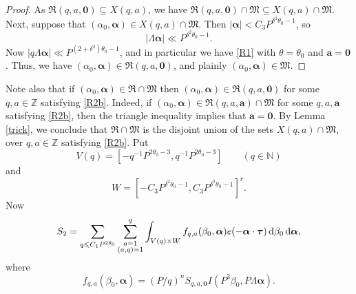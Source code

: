 \documentclass[12pt,reqno]{amsart}
\theoremstyle{definition}
\theoremstyle{remark}
\numberwithin{equation}{section}
\begin{document}
\begin{proof}
As ${\mathfrak R}(q,a, {\mathbf 0}) \subseteq X(q,a)$, we have ${\mathfrak R}(q,a,{\mathbf 0}) \cap {\mathfrak M} \subseteq X(q,a) \cap {\mathfrak M}$. Next, suppose that $({{\alpha}}_0,{\boldsymbol{{\alpha}}}) \in X(q,a) \cap {\mathfrak M}$. Then $|{\boldsymbol{{\alpha}}}| < C_3 P^{{{\delta}}^2 {{\theta}}_0-1}$, so
\[
|{{\Lambda}} {\boldsymbol{{\alpha}}}| \ll P^{{{\delta}} ^2 {{\theta}}_0-1}.
\]
Now $|q {{\Lambda}} {\boldsymbol{{\alpha}}}| \ll P^{(2+{{\delta}}^2){{\theta}}_0 - 1}$, and in particular we have \eqref{R1} with ${{\theta}} = {{\theta}}_0$ and ${\mathbf a} = {\mathbf 0}$. Thus, we have $({{\alpha}}_0,{\boldsymbol{{\alpha}}}) \in {\mathfrak R}(q,a,{\mathbf 0})$, and plainly $({{\alpha}}_0,{\boldsymbol{{\alpha}}}) \in{\mathfrak M}$.
\end{proof}

Note also that if $({{\alpha}}_0,{\boldsymbol{{\alpha}}}) \in {\mathfrak R} \cap {\mathfrak M}$ then $({{\alpha}}_0,{\boldsymbol{{\alpha}}}) \in {\mathfrak R}(q,a,{\mathbf 0})$ for some $q,a \in {\mathbb Z}$ satisfying \eqref{R2b}. Indeed, if $({{\alpha}}_0,{\boldsymbol{{\alpha}}}) \in {\mathfrak R}(q,a,{\mathbf a}) \cap {\mathfrak M}$ for some $q,a,{\mathbf a}$ satisfying \eqref{R2b}, then the triangle inequality implies that ${\mathbf a} = {\mathbf 0}$. By Lemma \ref{trick}, we conclude that ${\mathfrak R} \cap {\mathfrak M}$ is the disjoint union of the sets $X(q,a) \cap {\mathfrak M}$, over $q,a \in {\mathbb Z}$ satisfying \eqref{R2b}. Put
\[
V(q) = [-q^{-1} P^{2 {{\theta}}_0 -3}, q^{-1} P^{2 {{\theta}}_0 -3}] \qquad (q \in {\mathbb N})
\]
and
\[
W = [-C_3 P^{{{\delta}}^2 {{\theta}}_0 - 1}, C_3 P^{{{\delta}}^2 {{\theta}}_0 - 1}]^r.
\]
Now
\[
S_ 2 =  \sum_{q {\leqslant} C_1 P^{2 {{\theta}}_0}} \sum_{\substack{a=1 \\ (a,q)= 1}}^q \displaystyle \int_{V(q) \times W} 
f_{q,a}({{\beta}}_0,{\boldsymbol{{\alpha}}}) e(-{\boldsymbol{{\alpha}}} \cdot {\boldsymbol{\tau}}) {{\,{\rm d}}} {{\beta}}_0 {{\,{\rm d}}} {\boldsymbol{{\alpha}}},
\]
where
\begin{equation} \label{fdef}
f_{q,a}({{\beta}}_0,{\boldsymbol{{\alpha}}}) = (P/q)^nS_{q,a,{\mathbf 0}}I(P^3 {{\beta}}_0, P {{\Lambda}} {\boldsymbol{{\alpha}}}).
\end{equation}
\end{document}

